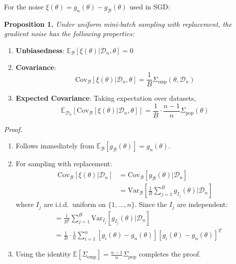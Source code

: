 \documentclass[11pt]{article}
\begin{document}
For the noise $\xi(\theta) = g_n(\theta) - g_{\mathcal{B}}(\theta)$ used in SGD:

\textbf{Proposition 1.} \textit{Under uniform mini-batch sampling with replacement, the gradient noise has the following properties:}

\begin{enumerate}
    \item \textbf{Unbiasedness}: $\mathbb{E}_{\mathcal{B}}[\xi(\theta) | \mathcal{D}_n, \theta] = 0$
    
    \item \textbf{Covariance}: 
    $$\text{Cov}_{\mathcal{B}}[\xi(\theta) | \mathcal{D}_n, \theta] = \frac{1}{B} \Sigma_{\text{emp}}(\theta, \mathcal{D}_n)$$
    
    \item \textbf{Expected Covariance}: Taking expectation over datasets,
    $$\mathbb{E}_{\mathcal{D}_n}[\text{Cov}_{\mathcal{B}}[\xi(\theta) | \mathcal{D}_n, \theta]] = \frac{1}{B} \cdot \frac{n-1}{n} \Sigma_{\text{pop}}(\theta)$$
\end{enumerate}

\textit{Proof.} 
\begin{enumerate}
    \item Follows immediately from $\mathbb{E}_{\mathcal{B}}[g_{\mathcal{B}}(\theta)] = g_n(\theta)$.
    
    \item For sampling with replacement:
    \begin{align}
    \text{Cov}_{\mathcal{B}}[\xi(\theta) | \mathcal{D}_n] &= \text{Cov}_{\mathcal{B}}[g_{\mathcal{B}}(\theta) | \mathcal{D}_n] \\
    &= \text{Var}_{\mathcal{B}}\left[\frac{1}{B} \sum_{j=1}^B g_{I_j}(\theta) \bigg| \mathcal{D}_n\right]
    \end{align}
    where $I_j$ are i.i.d.\ uniform on $\{1, ..., n\}$. Since the $I_j$ are independent:
    \begin{align}
    &= \frac{1}{B^2} \sum_{j=1}^B \text{Var}_{I_j}[g_{I_j}(\theta) | \mathcal{D}_n] \\
    &= \frac{1}{B} \cdot \frac{1}{n} \sum_{i=1}^n [g_i(\theta) - g_n(\theta)][g_i(\theta) - g_n(\theta)]^T
    \end{align}
    
    \item Using the identity $\mathbb{E}[\Sigma_{\text{emp}}] = \frac{n-1}{n} \Sigma_{\text{pop}}$ completes the proof.
\end{enumerate}
\end{document}
